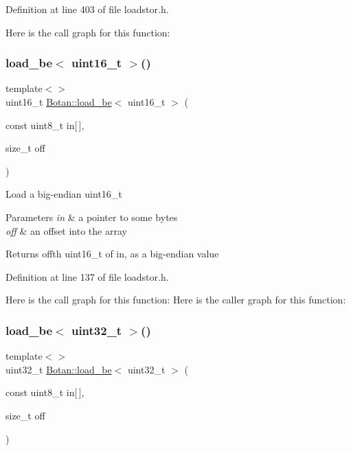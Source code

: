 Definition at line 403 of file loadstor.\+h.

Here is the call graph for this function\+:
\mbox{\label{namespace_botan_ab6bab280ff3476b4539a9c2946c690f1}} 
\subsubsection{\texorpdfstring{load\+\_\+be$<$ uint16\+\_\+t $>$()}{load\_be< uint16\_t >()}}
{\footnotesize\ttfamily template$<$$>$ \\
uint16\+\_\+t \mbox{\hyperlink{namespace_botan_a640029f085cc0a904b32e20f42303dd2}{Botan\+::load\+\_\+be}}$<$ uint16\+\_\+t $>$ (\begin{DoxyParamCaption}\item[{const uint8\+\_\+t}]{in\mbox{[}$\,$\mbox{]},  }\item[{size\+\_\+t}]{off }\end{DoxyParamCaption})\hspace{0.3cm}{\ttfamily [inline]}}

Load a big-\/endian uint16\+\_\+t 
\begin{DoxyParams}{Parameters}
{\em in} & a pointer to some bytes \\
\hline
{\em off} & an offset into the array \\
\hline
\end{DoxyParams}
\begin{DoxyReturn}{Returns}
off\textquotesingle{}th uint16\+\_\+t of in, as a big-\/endian value 
\end{DoxyReturn}


Definition at line 137 of file loadstor.\+h.

Here is the call graph for this function\+:
Here is the caller graph for this function\+:
\mbox{\label{namespace_botan_a859a883d8cb8ec54d5c8d62969260bd8}} 
\subsubsection{\texorpdfstring{load\+\_\+be$<$ uint32\+\_\+t $>$()}{load\_be< uint32\_t >()}}
{\footnotesize\ttfamily template$<$$>$ \\
uint32\+\_\+t \mbox{\hyperlink{namespace_botan_a640029f085cc0a904b32e20f42303dd2}{Botan\+::load\+\_\+be}}$<$ uint32\+\_\+t $>$ (\begin{DoxyParamCaption}\item[{const uint8\+\_\+t}]{in\mbox{[}$\,$\mbox{]},  }\item[{size\+\_\+t}]{off }\end{DoxyParamCaption})\hspace{0.3cm}{\ttfamily [inline]}}

